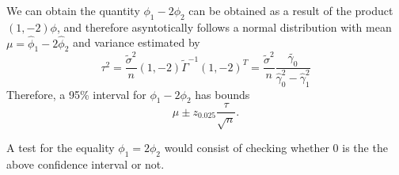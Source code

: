 \documentclass{article}
\theoremstyle{plain}
\theoremstyle{definition}
\newenvironment{sol}{\begin{trivlist}
 \item[\hskip \labelsep {\textit{Solution}.}\hskip \labelsep]}{\end{trivlist}}
\begin{document}
\begin{sol}
\begin{enumerate}[(a)]
We can obtain the quantity $\phi_1-2\phi_2$ can be obtained as a result of the product $(1,-2)\phi$, and therefore asyntotically follows a normal distribution with mean $\mu = \hat{\phi}_1-2\hat{\phi}_2$ and variance estimated by 
\[
\tau^2= \frac{\tilde{\sigma}^2}{n}(1,-2)\tilde{\Gamma}^{-1}(1,-2)^T= \frac{\tilde{\sigma}^2}{n}\frac{\tilde{\gamma_0}}{\hat{\gamma}_0^2-\hat{\gamma}_1^2}
\]
Therefore, a 95\% interval for $\phi_1-2\phi_2$ has bounds
\[
\mu \pm z_{0.025}\frac{\tau}{\sqrt{n}}.
\]

A test for the equality $\phi_1 = 2\phi_2$ would consist of checking whether 0 is the the above confidence interval or not.
\end{enumerate}
\end{sol}
\end{document}
